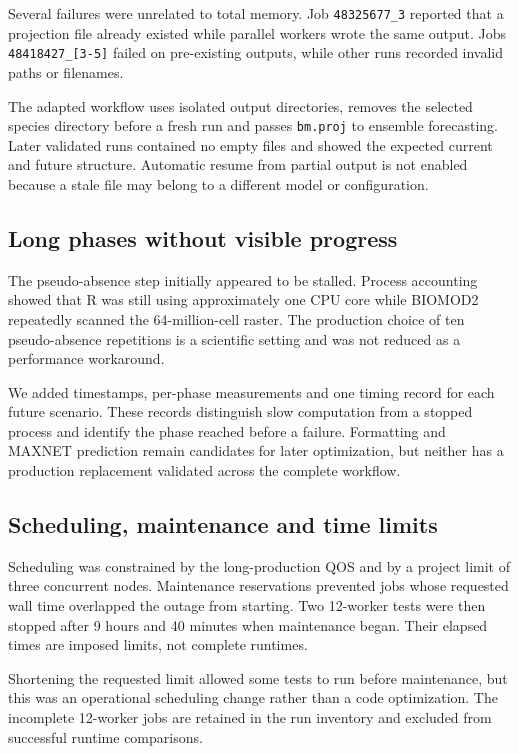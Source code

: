 Several failures were unrelated to total memory. Job \texttt{48325677\_3} reported that a projection file already existed while parallel workers wrote the same output. Jobs \nolinkurl{48418427_[3-5]} failed on pre-existing outputs, while other runs recorded invalid paths or filenames.

The adapted workflow uses isolated output directories, removes the selected species directory before a fresh run and passes \texttt{bm.proj} to ensemble forecasting. Later validated runs contained no empty files and showed the expected current and future structure. Automatic resume from partial output is not enabled because a stale file may belong to a different model or configuration.

\subsection{Long phases without visible progress}

The pseudo-absence step initially appeared to be stalled. Process accounting showed that R was still using approximately one CPU core while BIOMOD2 repeatedly scanned the 64-million-cell raster. The production choice of ten pseudo-absence repetitions is a scientific setting and was not reduced as a performance workaround.

We added timestamps, per-phase measurements and one timing record for each future scenario. These records distinguish slow computation from a stopped process and identify the phase reached before a failure. Formatting and MAXNET prediction remain candidates for later optimization, but neither has a production replacement validated across the complete workflow.

\subsection{Scheduling, maintenance and time limits}

Scheduling was constrained by the long-production QOS and by a project limit of three concurrent nodes. Maintenance reservations prevented jobs whose requested wall time overlapped the outage from starting. Two 12-worker tests were then stopped after 9 hours and 40 minutes when maintenance began. Their elapsed times are imposed limits, not complete runtimes.

Shortening the requested limit allowed some tests to run before maintenance, but this was an operational scheduling change rather than a code optimization. The incomplete 12-worker jobs are retained in the run inventory and excluded from successful runtime comparisons.


